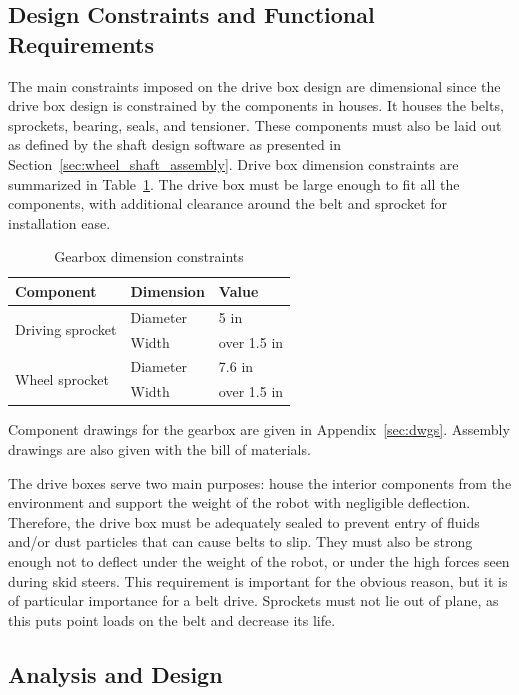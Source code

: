 \subsection{Design Constraints and Functional Requirements}

The main constraints imposed on the drive box design are dimensional since the drive box design is constrained by the components in houses. It houses the belts, sprockets, bearing, seals, and tensioner. These components must also be laid out as defined by the shaft design software as presented in Section~\ref{sec:wheel_shaft_assembly}. Drive box dimension constraints are summarized in Table~\ref{tab:box_dim}. The drive box must be large enough to fit all the components, with additional clearance around the belt and sprocket for installation ease.

\begin{table}[htbp]
\centering
\caption{Gearbox dimension constraints}
\begin{tabular}{| lll |}\hline
Component & Dimension & Value \\ \hline
\multirow{2}{*}{Driving sprocket} & Diameter & 5  in \\
& Width & over 1.5 in \\
\multirow{2}{*}{Wheel sprocket} & Diameter & 7.6  in \\
& Width & over 1.5 in \\ \hline
\end{tabular}
\label{tab:box_dim}
\end{table}

Component drawings for the gearbox are given in Appendix~\ref{sec:dwgs}. Assembly drawings are also given with the bill of materials.

The drive boxes serve two main purposes: house the interior components from the environment and support the weight of the robot with negligible deflection. Therefore, the drive box must be adequately sealed to prevent entry of fluids and/or dust particles that can cause belts to slip. They must also be strong enough not to deflect under the weight of the robot, or under the high forces seen during skid steers. This requirement is important for the obvious reason, but it is of particular importance for a belt drive. Sprockets must not lie out of plane, as this puts point loads on the belt and decrease its life.

\subsection{Analysis and Design}

